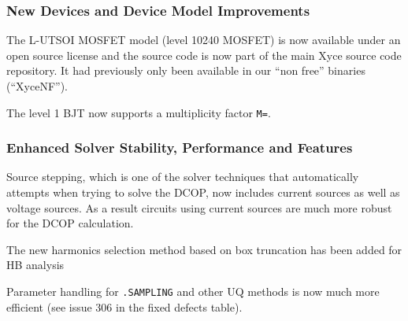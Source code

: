\documentclass[letterpaper]{scrartcl}
\begin{document}
\subsubsection*{New Devices and Device Model Improvements}
\begin{XyceItemize}
  \item The L-UTSOI MOSFET model (level 10240 MOSFET) is now available
    under an open source license and the source code is now part of
    the main Xyce source code repository.  It had previously only been
    available in our ``non free'' binaries (``XyceNF'').
  \item The level 1 BJT now supports a multiplicity factor \texttt{M=}.
\end{XyceItemize}

\subsubsection*{Enhanced Solver Stability, Performance and Features}
\begin{XyceItemize}
\item Source stepping, which is one of the solver techniques that
  \Xyce{} automatically attempts when trying to solve the DCOP, now
  includes current sources as well as voltage sources.  As a result
  circuits using current sources are much more robust for the DCOP
  calculation.
\item The new harmonics selection method based on box truncation has
  been added for HB analysis
\item Parameter handling for \texttt{.SAMPLING} and other UQ methods
  is now much more efficient (see issue 306 in the fixed defects
  table).
\end{XyceItemize}
\end{document}
